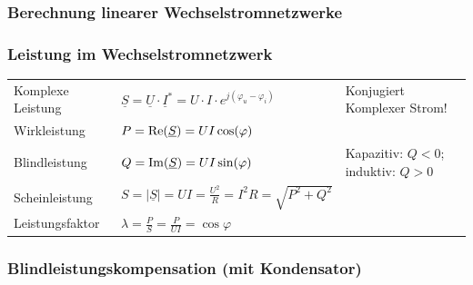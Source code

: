 		\subsubsection{Berechnung linearer Wechselstromnetzwerke}
		\subsubsection{Leistung im Wechselstromnetzwerk}%
				\begin{tabular}{p{4.5cm}p{7cm}p{7cm}}
					Komplexe Leistung &
						$ \underline{S} = \underline{U} \cdot \underline{I}^\ast = U\cdot I \cdot e^{j(\varphi_u-\varphi_i)}$   &
						Konjugiert Komplexer Strom! \\
					Wirkleistung &
						$ P = \operatorname{Re}(\underline{S}) = U I \cos(\varphi) $ \\
					Blindleistung &
						$ Q = \operatorname{Im}(\underline{S}) = U I \sin(\varphi) $ &
						Kapazitiv: $Q < 0$; induktiv: $Q > 0$ \\
					Scheinleistung &
						$ S = | \underline{S} | = U I = \frac{U^2}{R} = I^2 R = \sqrt{P^2+Q^2}$ \\
					Leistungsfaktor &
						$\lambda = \frac{P}{S} = \frac{P}{UI} = \cos \varphi$ \\
				\end{tabular}
		\subsubsection{Blindleistungskompensation (mit Kondensator)}
		
		
